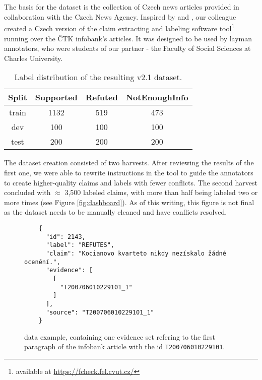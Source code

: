 \section{\CTK}

The basis for the \CTK{} dataset is the collection of Czech news articles provided in collaboration with the Czech News Agency. 
Inspired by \cite{fever} and \cite{danish_fever}, our colleague \cite{ullrich} created a Czech version of the claim extracting and labeling software tool\footnote{available at \url{https://fcheck.fel.cvut.cz/}} running over the ČTK infobank's articles. 
It was designed to be used by layman annotators, who were students of our partner - the Faculty of Social Sciences at Charles University.

\begin{table}[h!]
\centering
\begin{tabular}{c || c c c}
    Split & Supported & Refuted & NotEnoughInfo \\
    \hline
    train & 1132 & 519 & 473 \\
    dev & 100 & 100 & 100 \\
    test & 200 & 200 & 200
\end{tabular}
\caption[\CTK{} Dataset Label Distribution]{Label distribution of the resulting \CTK{} v2.1 dataset.}
\end{table}

The dataset creation consisted of two harvests. 
After reviewing the results of the first one, we were able to rewrite instructions in the tool to guide the annotators to create higher-quality claims and labels with fewer conflicts.
The second harvest concluded with $\approx$ 3,500 labeled claims, with more than half being labeled two or more times (see Figure \ref{fig:dashboard}).
As of this writing, this figure is not final as the dataset needs to be manually cleaned and have conflicts resolved. 

\begin{figure}[h!]
    \begin{framed}
    \begin{verbatim}
    {
      "id": 2143,
      "label": "REFUTES",
      "claim": "Kocianovo kvarteto nikdy nezískalo žádné ocenění.",
      "evidence": [
        [
          "T200706010229101_1"
        ]
      ],
      "source": "T200706010229101_1"
    }\end{verbatim}
    \vspace{-0.4cm}
    \end{framed}
    \caption[\CTK{} Dataset Example]{\CTK{} data example, containing one evidence set refering to the first paragraph of the \CTK{} infobank article with the id \texttt{T200706010229101}.}
    \label{fig:ctk_example}
\end{figure}

